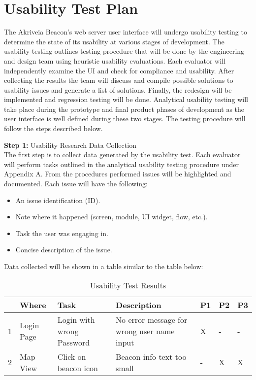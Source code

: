 

\setcounter{section}{5}
\section{Usability Test Plan}
\bigskip
The Akriveia Beacon’s web server user interface will undergo usability testing to determine the state of its usability at various stages of development. The usability testing outlines testing procedure that will be done by the engineering and design team using heuristic usability evaluations. Each evaluator will independently examine the UI and check for compliance and usability. After collecting the results the team will discuss and compile possible solutions to usability issues and generate a list of solutions. Finally, the redesign will be implemented and regression testing will be done. Analytical usability testing will take place during the prototype and final product phases of development as the user interface is well defined during these two stages. The testing procedure will follow the steps described below.

\bigskip

\textbf{Step 1:} Usability Research Data Collection\\
\medskip
The first step is to collect data generated by the usability test. Each evaluator will perform tasks outlined in the analytical usability testing procedure under Appendix A. From the procedures performed issues will be highlighted and documented. Each issue will have the following:
\begin{itemize}
\setlength\itemsep{0.1mm}
	\item An issue identification (ID).
	\item Note where it happened (screen, module, UI widget, flow, etc.).
	\item Task the user was engaging in.
	\item Concise description of the issue.
\end{itemize}
Data collected will be shown in a table similar to the table below:

\def\arraystretch{1.5}
\begin{table}[H]
\centering
\begin{tabular}{ | p{0.5cm} | p{2cm}| p{5cm} | p{5cm} | p{0.5cm} | p{0.5cm} | p{0.5cm}|} 
\hline

\rowcolor{lightgray} \multicolumn{1}{|l|}{\textbf{ID}} & \textbf{Where} & \textbf{Task} &  \textbf{Description} & \textbf{P1} & \textbf{P2} & \textbf{P3} \\ 
\hline
1 & Login Page & Login with wrong Password & No error message for wrong user name input & X & - & - \\
\hline
2 & Map View & Click on beacon icon & Beacon info text too small & - & X & X \\
\hline
\end{tabular}
\caption{Usability Test Results}
\end{table}	



